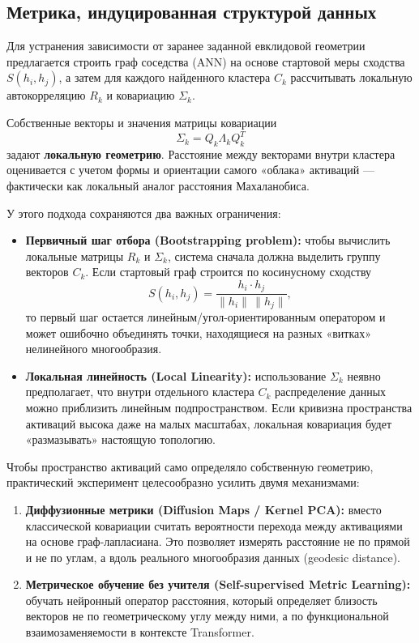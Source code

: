 \documentclass[11pt,a4paper]{article}
\begin{document}
\subsection*{Метрика, индуцированная структурой данных}

Для устранения зависимости от заранее заданной евклидовой геометрии предлагается строить граф соседства (ANN) на основе стартовой меры сходства $S(h_i,h_j)$, а затем для каждого найденного кластера $C_k$ рассчитывать локальную автокорреляцию $R_k$ и ковариацию $\Sigma_k$.

Собственные векторы и значения матрицы ковариации
\[
\Sigma_k = Q_k \Lambda_k Q_k^T
\]
задают \textbf{локальную геометрию}. Расстояние между векторами внутри кластера оценивается с учетом формы и ориентации самого «облака» активаций — фактически как локальный аналог расстояния Махаланобиса.

У этого подхода сохраняются два важных ограничения:

\begin{itemize}
    \item \textbf{Первичный шаг отбора (Bootstrapping problem):} чтобы вычислить локальные матрицы $R_k$ и $\Sigma_k$, система сначала должна выделить группу векторов $C_k$. Если стартовый граф строится по косинусному сходству
    \[
    S(h_i,h_j)=\frac{h_i \cdot h_j}{\|h_i\|\,\|h_j\|},
    \]
    то первый шаг остается линейным/угол-ориентированным оператором и может ошибочно объединять точки, находящиеся на разных «витках» нелинейного многообразия.
    \item \textbf{Локальная линейность (Local Linearity):} использование $\Sigma_k$ неявно предполагает, что внутри отдельного кластера $C_k$ распределение данных можно приблизить линейным подпространством. Если кривизна пространства активаций высока даже на малых масштабах, локальная ковариация будет «размазывать» настоящую топологию.
\end{itemize}

Чтобы пространство активаций само определяло собственную геометрию, практический эксперимент целесообразно усилить двумя механизмами:

\begin{enumerate}
    \item \textbf{Диффузионные метрики (Diffusion Maps / Kernel PCA):} вместо классической ковариации считать вероятности перехода между активациями на основе граф-лапласиана. Это позволяет измерять расстояние не по прямой и не по углам, а вдоль реального многообразия данных (geodesic distance).
    \item \textbf{Метрическое обучение без учителя (Self-supervised Metric Learning):} обучать нейронный оператор расстояния, который определяет близость векторов не по геометрическому углу между ними, а по функциональной взаимозаменяемости в контексте Transformer.
\end{enumerate}
\end{document}

